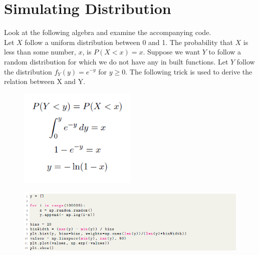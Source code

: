 \documentclass[answers]{exam}
\begin{document}
\begin{framed}
\begin{center}
\end{center}
\end{framed}

\newpage
\section{Simulating Distribution}
Look at the following algebra and examine the accompanying code.\\
Let $X$ follow a uniform distribution between 0 and 1. The probability that $X$ is less than some number, $x$, is $P(X < x) = x$. Suppose we want $Y$ to follow a random distribution for which we do not have any in built functions. Let $Y$ follow the distribution $f_Y(y) = e^{-y}$ for $y \geq 0$. The following trick is used to derive the relation between X and Y. \\
\begin{figure}[H]
            \centering
            \includegraphics[width= 0.5\textwidth]{Q2_question.PNG}
        \end{figure}
        
\begin{figure}[H]
            \centering
            \includegraphics[width= 1.0\textwidth]{Question2_ques_code.png}
           
        \end{figure}
\end{document}
